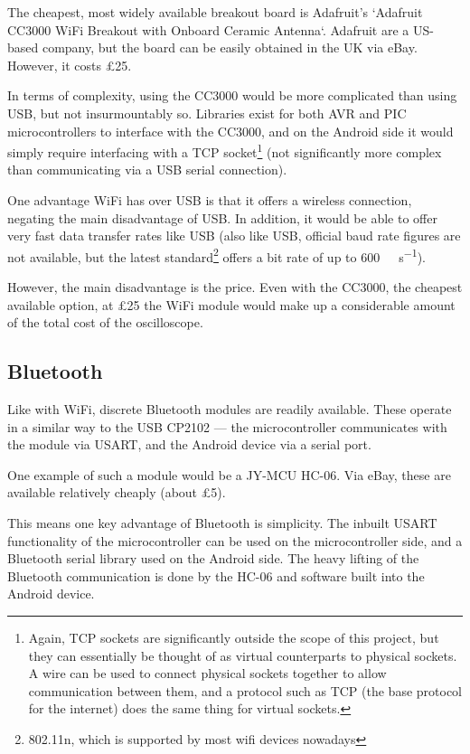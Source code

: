 The cheapest, most widely available breakout board is Adafruit's `Adafruit
CC3000 WiFi Breakout with Onboard Ceramic Antenna`. Adafruit are a US-based
company, but the board can be easily obtained in the UK via eBay. However, it
costs \pounds 25.

In terms of complexity, using the CC3000 would be more complicated than using
USB, but not insurmountably so. Libraries exist for both AVR and PIC
microcontrollers to interface with the CC3000, and on the Android side it would
simply require interfacing with a TCP socket\footnote{Again, TCP sockets are
significantly outside the scope of this project, but they can essentially be
thought of as virtual counterparts to physical sockets. A wire can be used to
connect physical sockets together to allow communication between them, and a
protocol such as TCP (the base protocol for the internet) does the same thing
for virtual sockets.} (not significantly more complex than communicating via a
USB serial connection).

One advantage WiFi has over USB is that it offers a wireless connection,
negating the main disadvantage of USB. In addition, it would be able to offer
very fast data transfer rates like USB (also like USB, official baud rate
figures are not available, but the latest standard\footnote{802.11n, which is
supported by most wifi devices nowadays} offers a bit rate of up to
\SI{600}{\mega\bit\per\second}).

However, the main disadvantage is the price. Even with the CC3000, the cheapest
available option, at \pounds 25 the WiFi module would make up a considerable
amount of the total cost of the oscilloscope.

\subsection*{Bluetooth}

Like with WiFi, discrete Bluetooth modules are readily available. These operate
in a similar way to the USB CP2102 --- the microcontroller communicates with the
module via USART, and the Android device via a serial port.

One example of such a module would be a JY-MCU HC-06. Via eBay, these are
available relatively cheaply (about \pounds 5).

This means one key advantage of Bluetooth is simplicity. The inbuilt USART
functionality of the microcontroller can be used on the microcontroller side,
and a Bluetooth serial library used on the Android side. The heavy lifting of
the Bluetooth communication is done by the HC-06 and software built into the
Android device.

